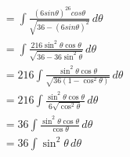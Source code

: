 \documentclass[preview]{standalone}
\begin{document}
\begin{align*}
&=\int \frac{(6sin\theta)^26cos\theta}{\sqrt{36-(6sin\theta)^2}} \, d\theta \\&=\int \frac{216\sin^2\theta\cos\theta}{\sqrt{36-36\sin^2\theta}} \, d\theta \\&=216 \int \frac{\sin^2\theta\cos\theta}{\sqrt{36(1-\cos^2\theta)}} \, d\theta \\&=216 \int \frac{\sin^2\theta\cos\theta}{6\sqrt{\cos^2\theta}} \, d\theta \\&=36 \int \frac{\sin^2\theta\cos\theta}{\cos\theta} \, d\theta \\&=36 \int \sin^2\theta \, d\theta
\end{align*}
\end{document}
